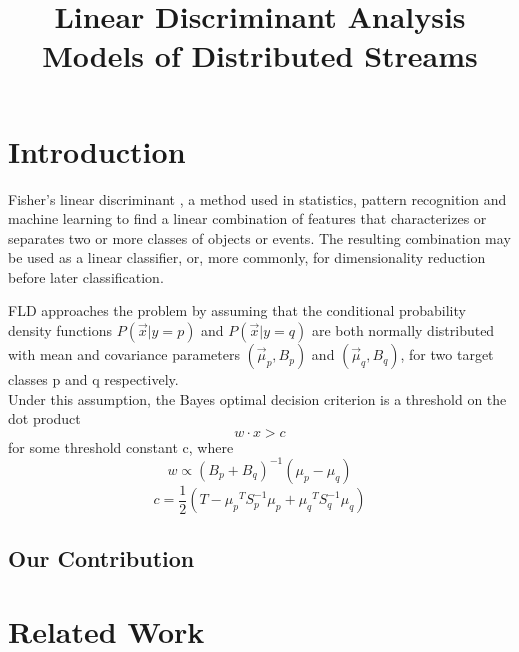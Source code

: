 \documentclass[11pt,twocolumn,varwidth=true,a4paper,fleqn]{article}
\begin{document}
\nocite{*}

\title{Linear Discriminant Analysis Models of Distributed Streams}
\date{}
\maketitle

\begin{abstract}
\end{abstract}

\section{Introduction}
\par Fisher's linear discriminant \cite{fisher1936use}, a method used in statistics, 
pattern recognition and machine learning to find a linear combination of features 
that characterizes or separates two or more classes of objects or events. 
The resulting combination may be used as a linear classifier, or, 
more commonly, for dimensionality reduction before later classification.
\\\par FLD approaches the problem by assuming that the conditional probability density functions $P(\vec x|y=p)$ and $P(\vec x|y=q)$ are both normally distributed with mean and covariance parameters $\left(\vec \mu_p, B_p\right)$ and $\left(\vec \mu_q, B_q\right)$, for two target classes p and q respectively.
\\Under this assumption, the Bayes optimal decision criterion is a threshold on the dot product
\begin{equation*} \label{eq:decision}
w \cdot x > c
\end{equation*}
for some threshold constant c, where
\begin{equation} \label{eq:w}
w \propto (B_p+B_q)^{-1}(\mu_p - \mu_q)
\end{equation}
\begin{equation} \label{eq:c}
c = \frac{1}{2}(T-{\mu_p}^T S_p^{-1} {\mu_p}+{\mu_q}^T S_q^{-1} {\mu_q})
\end{equation}
\subsection{Our Contribution}

\section{Related Work}
\end{document}
